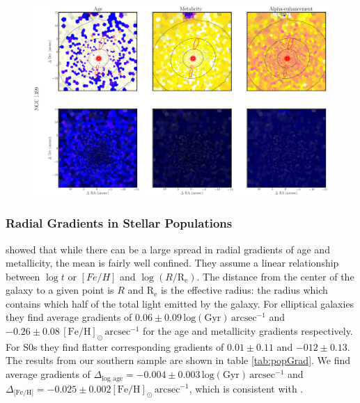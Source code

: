 		\begin{figure}
			\centering
			\includegraphics[height=0.31\textheight]{chapter4/muse/pop2.png}
		\end{figure}


		\subsubsection{Radial Gradients in Stellar Populations}
			\label{subsubsec:popGrad}

			\citet{Koleva2011} showed that while there can be a large spread in radial gradients of age and metallicity, the mean is fairly well confined. They assume a linear relationship between $\log t$ or $[Fe/H]$ and $\log (R/\mathrm{R_e})$. The distance from the center of the galaxy to a given point is $R$ and $\mathrm{R_e}$ is the effective radius: the radius which contains which half of the total light emitted by the galaxy. For elliptical galaxies they find average gradients of $0.06\pm0.09 \, \mathrm{log(Gyr) \, arcsec^{-1}}$ and $-0.26\pm0.08 \, \mathrm{[Fe/H]_\odot \, arcsec^{-1}}$ for the age and metallicity gradients respectively. For S0s they find flatter corresponding gradients of $0.01\pm0.11$ and $-012\pm0.13$. The results from our southern sample are shown in table \ref{tab:popGrad}. We find average gradients of $\Delta_\text{log age} = -0.004\pm0.003 \,\mathrm{log(Gyr) \, arcsec^{-1}}$ and $\Delta_\text{[Fe/H]} = -0.025\pm0.002 \mathrm{[Fe/H]_\odot \, arcsec^{-1}}$, which is consistent with \citet{Koleva2011}.

